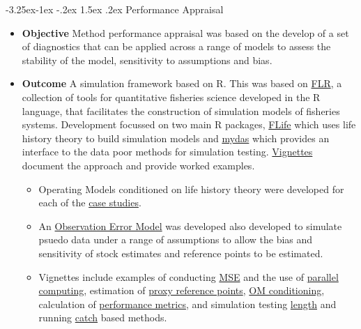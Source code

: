 \documentclass[a4paper, 10pt]{article}
\makeatletter
\renewcommand{\subsection}{\@startsection{subsection}{2}{\z@}%
 {-3.25ex\@plus -1ex \@minus -.2ex}%
 {1.5ex \@plus .2ex}%
 {\normalfont\bfseries\slshape}}
\makeatother
\begin{document}
\subsection{Performance Appraisal}
 
\begin{itemize}[labelindent=\parindent,noitemsep,topsep=0pt,parsep=0pt,partopsep=0pt]
 \item \textbf{Objective} Method performance appraisal was based on the develop of a set of diagnostics that can be applied across a range of models to assess the stability of the model, sensitivity to assumptions and bias.
 
 \item \textbf{Outcome} A simulation framework based on R. This was based on \href{http://www.flr-project.org/}{FLR}, a collection of tools for quantitative fisheries science developed in the R language, that facilitates the construction of simulation models of fisheries systems. Development focussed on two main R packages, \href{https://github.com/flr/flife}{FLife} which uses life history theory to build simulation models and 
    \href{https://github.com/flr/mydas/wiki}{mydas} which provides an interface to the data poor methods for simulation testing. \href{https://3o2y9wugzp1kfxr5hvzgzq-on.drv.tw/MyDas/vignettes.html}{Vignettes} document the approach and provide worked examples. 
    \begin{itemize}
   \item Operating Models conditioned on life history theory were developed for each of the 
    \href{https://3o2y9wugzp1kfxr5hvzgzq-on.drv.tw/MyDas/om.html}{case studies}.
    \item An \href{https://3o2y9wugzp1kfxr5hvzgzq-on.drv.tw/MyDas/vignettes/oemod.html}{Observation Error Model} was developed also developed to simulate psuedo data under a range of assumptions to allow the bias and sensitivity of stock estimates and reference points to be estimated.    
    \item Vignettes include examples of conducting \href{https://3o2y9wugzp1kfxr5hvzgzq-on.drv.tw/MyDas/vignettes/mse.html}{MSE} and the use of \href{https://3o2y9wugzp1kfxr5hvzgzq-on.drv.tw/MyDas/vignettes/parallel.html}{parallel computing}, estimation of
    \href{https://3o2y9wugzp1kfxr5hvzgzq-on.drv.tw/MyDas/vignettes/proxies.html}{proxy reference points},  \href{https://3o2y9wugzp1kfxr5hvzgzq-on.drv.tw/MyDas/vignettes/turbot.html}{OM conditioning}, calculation of \href{https://3o2y9wugzp1kfxr5hvzgzq-on.drv.tw/MyDas/vignettes/performance.html}{performance metrics}, and simulation testing \href{https://3o2y9wugzp1kfxr5hvzgzq-on.drv.tw/MyDas/vignettes/length.html}{length} and running    \href{https://3o2y9wugzp1kfxr5hvzgzq-on.drv.tw/MyDas/vignettes/sra.html}{catch} based methods.
    \end{itemize}
\end{itemize}
\end{document}
